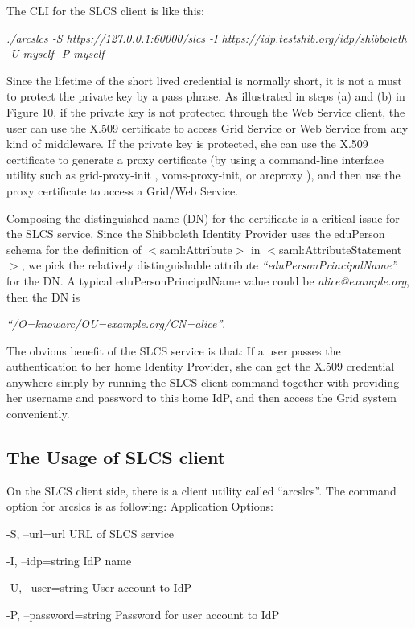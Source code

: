 \documentclass{article}                            %
\begin{document}
The CLI for the SLCS client is like this:

\textit{./arcslcs -S https://127.0.0.1:60000/slcs -I https://idp.testshib.org/idp/shibboleth -U myself -P myself}

    Since the lifetime of the short lived credential is normally short, it is not a must to protect the private key by a pass phrase. As illustrated in steps (a) and (b) in Figure 10, if the private key is not protected through the Web Service client, the user can use the X.509 certificate to access Grid Service or Web Service from any kind of middleware. If the private key is protected, she can use the X.509 certificate to generate a proxy certificate (by using a command-line interface utility such as grid-proxy-init , voms-proxy-init, or arcproxy ), and then use the proxy certificate to access a Grid/Web Service.

    Composing the distinguished name (DN) for the certificate is a critical issue for the SLCS service. Since the Shibboleth Identity Provider uses the eduPerson schema for the definition of $<$saml:Attribute$>$ in $<$saml:AttributeStatement$>$, we pick the relatively distinguishable attribute \textit{``eduPersonPrincipalName''} for the DN. A typical eduPersonPrincipalName value could be \textit{alice@example.org}, then the DN is

\textit{``/O=knowarc/OU=example.org/CN=alice''}.

    The obvious benefit of the SLCS service is that: If a user passes the authentication to her home Identity Provider, she can get the X.509 credential anywhere simply by running the SLCS client command together with providing her username and password to this home IdP, and then access the Grid system conveniently.

\subsection{The Usage of SLCS client} %
\label{subsec:slcs_client}

    On the SLCS client side, there is a client utility called ``arcslcs''.  The command option for arcslcs is as following:
Application Options:

  -S, --url=url                URL of SLCS service

  -I, --idp=string             IdP name

  -U, --user=string            User account to IdP

  -P, --password=string        Password for user account to IdP
\end{document}
